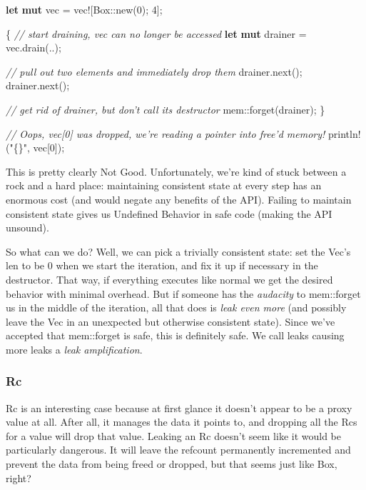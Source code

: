 \documentclass[a4paper,]{book}
\newenvironment{Shaded}{\begin{snugshade}}{\end{snugshade}}
\newcommand{\KeywordTok}[1]{\textcolor[rgb]{0.13,0.29,0.53}{\textbf{{#1}}}}
\newcommand{\DecValTok}[1]{\textcolor[rgb]{0.00,0.00,0.81}{{#1}}}
\newcommand{\StringTok}[1]{\textcolor[rgb]{0.31,0.60,0.02}{{#1}}}
\newcommand{\CommentTok}[1]{\textcolor[rgb]{0.56,0.35,0.01}{\textit{{#1}}}}
\newcommand{\OtherTok}[1]{\textcolor[rgb]{0.56,0.35,0.01}{{#1}}}
\newcommand{\NormalTok}[1]{{#1}}
\begin{document}
\begin{Shaded}
\begin{Highlighting}[]
\KeywordTok{let} \KeywordTok{mut} \NormalTok{vec = }\OtherTok{vec!}\NormalTok{[Box::new(}\DecValTok{0}\NormalTok{); }\DecValTok{4}\NormalTok{];}

\NormalTok{\{}
    \CommentTok{// start draining, vec can no longer be accessed}
    \KeywordTok{let} \KeywordTok{mut} \NormalTok{drainer = vec.drain(..);}

    \CommentTok{// pull out two elements and immediately drop them}
    \NormalTok{drainer.next();}
    \NormalTok{drainer.next();}

    \CommentTok{// get rid of drainer, but don't call its destructor}
    \NormalTok{mem::forget(drainer);}
\NormalTok{\}}

\CommentTok{// Oops, vec[0] was dropped, we're reading a pointer into free'd memory!}
\OtherTok{println!}\NormalTok{(}\StringTok{"\{\}"}\NormalTok{, vec[}\DecValTok{0}\NormalTok{]);}
\end{Highlighting}
\end{Shaded}

This is pretty clearly Not Good. Unfortunately, we're kind of stuck
between a rock and a hard place: maintaining consistent state at every
step has an enormous cost (and would negate any benefits of the API).
Failing to maintain consistent state gives us Undefined Behavior in safe
code (making the API unsound).

So what can we do? Well, we can pick a trivially consistent state: set
the Vec's len to be 0 when we start the iteration, and fix it up if
necessary in the destructor. That way, if everything executes like
normal we get the desired behavior with minimal overhead. But if someone
has the \emph{audacity} to mem::forget us in the middle of the
iteration, all that does is \emph{leak even more} (and possibly leave
the Vec in an unexpected but otherwise consistent state). Since we've
accepted that mem::forget is safe, this is definitely safe. We call
leaks causing more leaks a \emph{leak amplification}.

\subsubsection{Rc}\label{rc}

Rc is an interesting case because at first glance it doesn't appear to
be a proxy value at all. After all, it manages the data it points to,
and dropping all the Rcs for a value will drop that value. Leaking an Rc
doesn't seem like it would be particularly dangerous. It will leave the
refcount permanently incremented and prevent the data from being freed
or dropped, but that seems just like Box, right?
\end{document}
